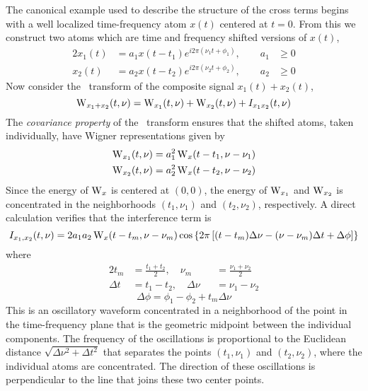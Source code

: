 The canonical example used to describe the structure of the 
cross terms begins with a well localized time-frequency atom $x(t)$
centered at $t=0$.  From this we construct two atoms which are time
and frequency shifted versions of $x(t)$,
\begin{alignat*}{2}%
x_1(t)&=a_1 x(t-t_1) e^{i2\pi(\nu_1t+\phi_1)}, \qquad a_1 &\geq 0\\
x_2(t)&=a_2 x(t-t_2) e^{i2\pi(\nu_2t+\phi_2)}, \qquad a_2 &\geq 0
\end{alignat*}%
Now consider the \WV\ transform of the composite signal $x_1(t)+x_2(t)$,
\[
  \operatorname{W}_{x_1+x_2}(t,\nu) 
    = \operatorname{W}_{x_1}(t,\nu)+\operatorname{W}_{x_2}(t,\nu) + I_{x_1x_2}(t,\nu)
\]
The \emph{covariance property} of the \WV\ transform ensures that
the shifted atoms, taken individually, have Wigner representations
given by  
\begin{align*}
\operatorname{W}_{x_1}(t,\nu) &= a^2_1\operatorname{W}_x(t-t_1,\nu-\nu_1)\\
\operatorname{W}_{x_2}(t,\nu) &= a^2_2\operatorname{W}_x(t-t_2,\nu-\nu_2)
\end{align*}
Since the energy of $\operatorname{W}_x$ is centered at $(0,0)$, the energy of
$\operatorname{W}_{x_1}$ and $\operatorname{W}_{x_2}$ is concentrated in the neighborhoods
$(t_1,\nu_1)$ and $(t_2,\nu_2)$, respectively.  A direct calculation
verifies that the interference term is
\[
  I_{x_1,x_2}(t,\nu)=
    2a_1a_2\operatorname{W}_x(t-t_m,\nu-\nu_m)
    \cos\left\{2\pi \left[(t-t_m)\Delta\nu 
               -(\nu-\nu_m)\Delta t +\Delta\phi\right]\right\}
\]
where %
\begin{alignat*}{2}%
  t_m    &= \frac{t_1+t_2}{2}, \quad 
  \nu_m &&= \frac{\nu_1+\nu_2}{2}\\
  \Delta t    &= t_1-t_2,\quad
  \Delta \nu &&= \nu_1-\nu_2
\end{alignat*}
\[\Delta \phi = \phi_1-\phi_2 + t_m\Delta \nu\]
This is an oscillatory waveform concentrated in a neighborhood of the
point in the time-frequency plane that is the geometric midpoint 
between the individual components.  The frequency of the oscillations
is proportional to the Euclidean distance
$\sqrt{\Delta \nu^2 + \Delta t^2}$ that separates the points
$(t_1,\nu_1)$ and $(t_2,\nu_2)$, where the individual atoms are
concentrated.  The direction of these oscillations is perpendicular to
the line that joins these two center points.

